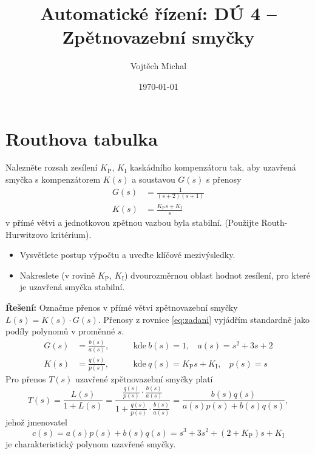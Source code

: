 \documentclass[twoside]{article}
\title{Automatické řízení: DÚ 4 -- Zpětnovazební smyčky}
\author{Vojtěch Michal}
\date{\today}
\begin{document}
\maketitle

\section{Routhova tabulka}
Nalezněte rozsah zesílení $K_\text{P}$, $K_\text{I}$ kaskádního kompenzátoru tak, aby uzavřená smyčka s kompenzátorem $K(s)$ a soustavou $G(s)$
s přenosy
\begin{equation}
	\begin{split}
		\label{eq:zadani}
		G(s) &= \frac{1}{(s+2)(s+1)} \\
		K(s) &= \frac{K_\text{P} s + K_\text{I}}{s}
	\end{split}
\end{equation}
v přímé větvi a jednotkovou zpětnou vazbou byla stabilní. (Použijte Routh-Hurwitzovo kritérium).
\begin{itemize}
	\item Vysvětlete postup výpočtu a uveďte klíčové mezivýsledky.
	\item Nakreslete (v rovině $K_\text{P}$, $K_\text{I}$) dvourozměrnou oblast hodnot zesílení, pro které je uzavřená smyčka stabilní.
\end{itemize}
\textbf{Řešení:} 
Označme přenos v přímé větvi zpětnovazební smyčky $L(s) = K(s) \cdot G(s)$. Přenosy z rovnice \eqref{eq:zadani} 
vyjádřím standardně jako podíly polynomů v proměnné $s$.
\begin{equation}
	\begin{split}
		G(s) &= \frac{b(s)}{a(s)} \text{, ~~~~~~~ kde} ~ b(s) = 1,~~~~ a(s) = s^2 + 3s + 2 \\
		K(s) &= \frac{q(s)}{p(s)} \text{, ~~~~~~~ kde} ~ q(s) = K_\text{P} s + K_\text{I},~~~~ p(s) = s 
	\end{split}
\end{equation}
Pro přenos $T(s)$ uzavřené zpětnovazební smyčky platí
\begin{equation}
	T(s) = \frac{L(s)}{1 + L(s)} = \frac{\frac{q(s)}{p(s)} \cdot \frac{b(s)}{a(s)}}{1 + \frac{q(s)}{p(s)} \cdot \frac{b(s)}{a(s)}}
	=  \frac{b(s)q(s)}{a(s)p(s) + b(s)q(s)},
\end{equation}
jehož jmenovatel
\begin{equation}
	c(s) = a(s)p(s) + b(s)q(s) = s^3 + 3s^2 + (2+ K_\text{P})s + K_\text{I}
	\label{eq:char_polynom}
\end{equation}
je charakteristický polynom uzavřené smyčky.
\end{document}
